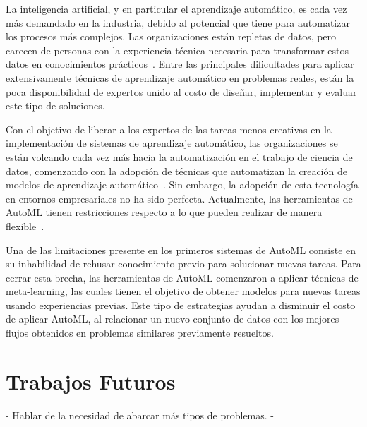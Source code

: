 \begin{conclusions}\label{conclusion}

\qquad 


La inteligencia artificial, y en particular el aprendizaje automático, es cada vez más demandado en la industria, debido al potencial que tiene para automatizar los procesos más complejos. Las organizaciones están repletas de datos, pero carecen de personas con la experiencia técnica necesaria para transformar estos datos en conocimientos prácticos~\cite{miller2017quant}. Entre las principales dificultades para aplicar extensivamente técnicas de aprendizaje automático en problemas reales, están la poca disponibilidad de expertos unido al costo de diseñar, implementar y evaluar este tipo de soluciones. 

Con el objetivo de liberar a los expertos de las tareas menos creativas en la implementación de sistemas de aprendizaje automático, las organizaciones se están volcando cada vez más hacia la automatización en el trabajo de ciencia de datos, comenzando con la adopción de técnicas que automatizan la creación de modelos de aprendizaje automático~\cite{drozdal2020trust, wang2019humanai}. Sin embargo, la adopción de esta tecnología en entornos empresariales no ha sido perfecta. Actualmente, las herramientas de AutoML tienen restricciones respecto a lo que pueden realizar de manera flexible~\cite{crisan2021fits}. %

Una de las limitaciones presente en los primeros sistemas de AutoML consiste en su inhabilidad de rehusar conocimiento previo para solucionar nuevas tareas. Para cerrar esta brecha, las herramientas de AutoML comenzaron a aplicar técnicas de meta-learning, las cuales tienen el objetivo de obtener modelos para nuevas tareas usando experiencias previas. Este tipo de estrategias ayudan a disminuir el costo de aplicar AutoML, al relacionar un nuevo conjunto de datos con los mejores flujos obtenidos en problemas similares previamente resueltos. 

\section{Trabajos Futuros}

- Hablar de la necesidad de abarcar más tipos de problemas. 
- 

\end{conclusions}

